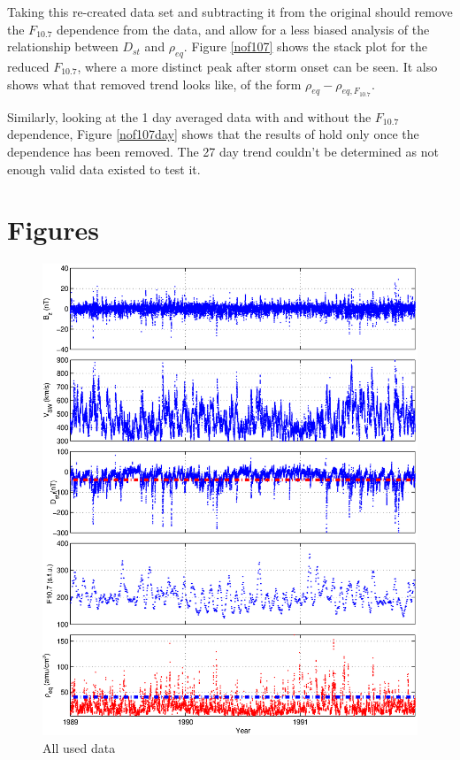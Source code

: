 \documentclass[10pt,twocolumn]{article}
\begin{document}
Taking this re-created data set and subtracting it from the original should remove the $F_{10.7}$ dependence from the data, and allow for a less biased analysis of the relationship between $D_{st}$ and $\rho_{eq}$. Figure \ref{nof107} shows the stack plot for the reduced $F_{10.7}$, where a more distinct peak after storm onset can be seen. It also shows what that removed trend looks like, of the form $\rho_{eq}-\rho_{eq,F_{10.7}}$.



Similarly, looking at the 1 day averaged data with and without the $F_{10.7}$ dependence, Figure \ref{nof107day} shows that the results of \cite{Takahashi2010} hold only once the dependence has been removed. The 27 day trend couldn't be determined as not enough valid data existed to test it.



\newpage
\footnotesize




\section{Figures}

\begin{figure}[htp]
\centering
\includegraphics[scale=0.7]{paperfigures/alldata.eps}
\caption{All used data}
\label{AllData}
\end{figure}
\clearpage
\end{document}
